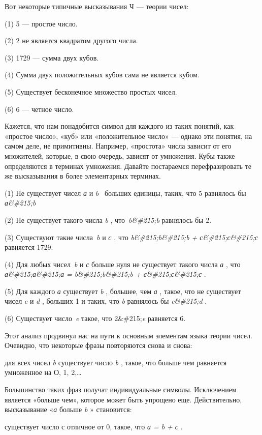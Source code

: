 \documentclass[../main.tex]{subfiles}
\begin{document}
Вот некоторые типичные высказывания Ч --- теории чисел:

(1) 5 --- простое число.

(2) 2 не является квадратом другого числа.

(3) 1729 --- сумма двух кубов.

(4) Сумма двух положительных кубов сама не является кубом.

(5) Существует бесконечное множество простых чисел.

(6) 6 --- четное число.

Кажется, что нам понадобится символ для каждого из таких понятий, как «простое число», «куб» или «положительное число» --- однако эти понятия, на самом деле, не примитивны. Например, «простота» числа зависит от его множителей, которые, в свою очередь, зависят от умножения. Кубы также определяются в терминах умножения. Давайте постараемся перефразировать те же высказывания в более элементарных терминах.

(1) Не существует чисел \emph{а} и \emph{b} ~больших единицы, таких, что 5 равнялось бы \emph{а\&\#215;b}

(2) Не существует такого числа \emph{b} , что~\emph{b\&\#215;b} равнялось бы 2.

(3) Существуют такие числа~\emph{b} и \emph{с} , что \emph{b\&\#215;b\&\#215;b + с\&\#215;с\&\#215;с} равняется 1729.

(4) Для любых чисел~\emph{b} и \emph{с} больше нуля не существует такого числа \emph{а} , что \emph{а\&\#215;а\&\#215;а = b\&\#215;b\&\#215;b + с\&\#215;с\&\#215;с} .

(5) Для каждого \emph{а} существует \emph{b} , большее, чем \emph{а} , такое, что не существует чисел \emph{c} и \emph{d} , больших 1 и таких, что \emph{b} равнялось бы \emph{c\&\#215;d} .

(6) Существует число~\emph{e} такое, что 2\&\#215;\emph{e} равняется 6.

Этот анализ продвинул нас на пути к основным элементам языка теории чисел. Очевидно, что некоторые фразы повторяются снова и снова:

для всех чисел \emph{b} существует число \emph{b} , такое, что больше чем равняется умноженное на О, 1, 2,\ldots{}

Большинство таких фраз получат индивидуальные символы. Исключением является «больше чем», которое может быть упрощено еще. Действительно, высказывание «\emph{а} больше \emph{b} » становится:

существует число с отличное от 0, такое, что \emph{а = b + с} .
\end{document}
